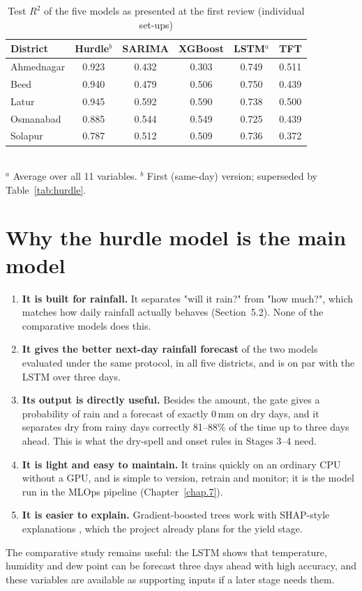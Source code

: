 \begin{table}[H]
	\centering
	\caption{Test $R^2$ of the five models as presented at the first review (individual set-ups)}
	\label{tab:review}
	\begin{tabular}{lccccc}
		\toprule
		\textbf{District} & \textbf{Hurdle$^b$} & \textbf{SARIMA} & \textbf{XGBoost} & \textbf{LSTM$^a$} & \textbf{TFT} \\
		\midrule
		Ahmednagar & 0.923 & 0.432 & 0.303 & 0.749 & 0.511 \\
		Beed & 0.940 & 0.479 & 0.506 & 0.750 & 0.439 \\
		Latur & 0.945 & 0.592 & 0.590 & 0.738 & 0.500 \\
		Osmanabad & 0.885 & 0.544 & 0.549 & 0.725 & 0.439 \\
		Solapur & 0.787 & 0.512 & 0.509 & 0.736 & 0.372 \\
		\bottomrule
	\end{tabular}
	\\[2pt]
	\footnotesize $^a$ Average over all 11 variables. \quad $^b$ First (same-day) version; superseded by Table~\ref{tab:hurdle}.
\end{table}

\section{Why the hurdle model is the main model}
\begin{enumerate}
	\item \textbf{It is built for rainfall.} It separates "will it rain?" from "how much?", which matches how daily rainfall actually behaves (Section~5.2). None of the comparative models does this.
	\item \textbf{It gives the better next-day rainfall forecast} of the two models evaluated under the same protocol, in all five districts, and is on par with the LSTM over three days.
	\item \textbf{Its output is directly useful.} Besides the amount, the gate gives a probability of rain and a forecast of exactly 0\,mm on dry days, and it separates dry from rainy days correctly 81--88\% of the time up to three days ahead. This is what the dry-spell and onset rules in Stages 3--4 need.
	\item \textbf{It is light and easy to maintain.} It trains quickly on an ordinary CPU without a GPU, and is simple to version, retrain and monitor; it is the model run in the MLOps pipeline (Chapter~\ref{chap.7}).
	\item \textbf{It is easier to explain.} Gradient-boosted trees work with SHAP-style explanations \cite{lundberg2017unified}, which the project already plans for the yield stage.
\end{enumerate}
The comparative study remains useful: the LSTM shows that temperature, humidity and dew point can be forecast three days ahead with high accuracy, and these variables are available as supporting inputs if a later stage needs them.


